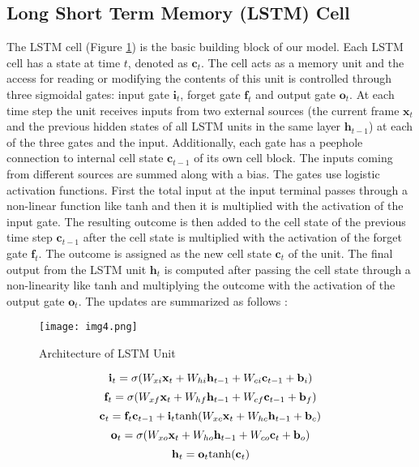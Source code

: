 \documentclass[sigconf]{acmart}
\begin{document}
\subsection{Long Short Term Memory (LSTM) Cell}
The LSTM cell (Figure \ref{fig1}) is the basic building block of our model. Each LSTM cell has a state at time $t$, denoted as $\mathbf{c}_t$. The cell acts as a memory unit and the access for reading or modifying the contents of this unit is controlled through three sigmoidal gates: input gate $\mathbf{i}_t$, forget gate $\mathbf{f}_t$ and output gate $\mathbf{o}_t$. At
each time step the unit receives inputs from two external sources (the current frame $\mathbf{x}_t$ and the previous hidden states of all LSTM units in the same layer $\mathbf{h}_{t-1}$) at each of the three gates and the input. Additionally, each gate has a peephole connection to  internal cell state $\mathbf{c}_{t-1}$ of its own cell block. The
inputs coming from different sources are summed along with a bias. The gates use logistic activation functions. First the total input at the input terminal passes through a non-linear function like tanh and then it is multiplied with the activation of the input gate. The resulting outcome is then added to the cell state of the previous time step $\mathbf{c}_{t-1}$ after the cell state is multiplied with the activation of the forget gate $\mathbf{f}_t$. The outcome is assigned as the new cell state $\mathbf{c}_t$ of the unit. The final output from the LSTM unit $\mathbf{h}_t$ is computed after passing the cell state through a non-linearity like tanh and multiplying the outcome with the activation of the output gate $\mathbf{o}_t$. The updates are summarized as follows \cite{graves} :
\begin{figure}
    \centering
    \texttt{[image: img4.png]}
    \caption{Architecture of LSTM Unit}
    \label{fig1}
\end{figure}\begin{equation*}
    \centering
  \mathbf{i}_t=\sigma (W_{xi}\mathbf{x}_t+W_{hi}\mathbf{h}_{t-1}+W_{ci}\mathbf{c}_{t-1}+\mathbf{b}_i)
  \end{equation*}\begin{equation*}
  \centering
  \mathbf{f}_t=\sigma (W_{xf}\mathbf{x}_t+W_{hf}\mathbf{h}_{t-1}+W_{cf}\mathbf{c}_{t-1}+\mathbf{b}_f)
  \end{equation*}\begin{equation*}
  \centering
  \mathbf{c}_t=\mathbf{f}_t\mathbf{c}_{t-1}+\mathbf{i}_{t}\mathrm{tanh}(W_{xc}\mathbf{x}_t+W_{hc}\mathbf{h}_{t-1}+\mathbf{b}_c)
  \end{equation*}\begin{equation*}
  \centering
  \mathbf{o}_t=\sigma (W_{xo}\mathbf{x}_t+W_{ho}\mathbf{h}_{t-1}+W_{co}\mathbf{c}_{t}+\mathbf{b}_o)
  \end{equation*}\begin{equation*}
  \centering
  \mathbf{h}_t=\mathbf{o}_t\mathrm{tanh}(\mathbf{c}_t)
\end{equation*}
\end{document}
